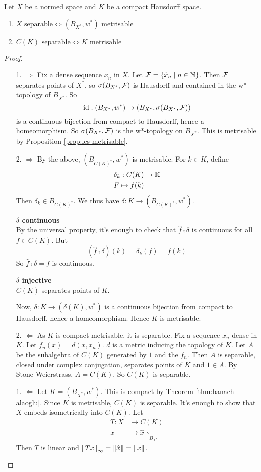 \documentclass{article}
\begin{document}
\begin{prop}\label{prop:ck-separable}
  Let $X$ be a normed space and $K$ be a compact Hausdorff space.
  \begin{enumerate}
    \item $X \text{ separable} \iff (B_{X^*}, w^*) \text{ metrisable}$
    \item $C(K) \text{ separable} \iff K \text{ metrisable}$
  \end{enumerate}
\end{prop}
\begin{proof}~
  \begin{itemize}
    \item[1. $\Rightarrow$] Fix a dense sequence $x_n$ in $X$. Let $\mathcal F = \{\hat x_n \mid n \in \mathbb N\}$. Then $\mathcal F$ separates points of $X^*$, so $\sigma(B_{X^*}, \mathcal F)$ is Hausdorff and contained in the w*-topology of $B_{X^*}$. So
    $$\operatorname{id} : (B_{X^*}, w^*) \to (B_{X^*}, \sigma(B_{X^*}, \mathcal F))$$
    is a continuous bijection from compact to Hausdorff, hence a homeomorphism. So $\sigma(B_{X^*}, \mathcal F)$ is the w*-topology on $B_{X^*}$. This is metrisable by Proposition \ref{prop:lcs-metrisable}.
  \item[2. $\Rightarrow$] By the above, $(B_{C(K)^*}, w^*)$ is metrisable. For $k \in K$, define
  \begin{align*}
    \delta_k : C(K) & \to \mathbb K \\
    F \mapsto f(k)
  \end{align*}
  Then $\delta_k \in B_{C(K)^*}$. We thus have $\delta : K \to (B_{C(K)^*}, w^*)$.

  {\bf $\delta$ continuous} \\
  By the universal property, it's enough to check that $\hat f \comp \delta$ is continuous for all $f \in C(K)$. But
  $$(\hat f \comp \delta)(k) = \delta_k(f) = f(k)$$
  So $\hat f \comp \delta = f$ is continuous.

  {\bf $\delta$ injective} \\
  $C(K)$ separates points of $K$.

  Now, $\delta : K \to (\delta(K), w^*)$ is a continuous bijection from compact to Hausdorff, hence a homeomorphism. Hence $K$ is metrisable.
  \item[2. $\Leftarrow$] As $K$ is compact metrisable, it is separable. Fix a sequence $x_n$ dense in $K$. Let $f_n(x) = d(x, x_n)$. $d$ is a metric inducing the topology of $K$. Let $A$ be the subalgebra of $C(K)$ generated by $1$ and the $f_n$. Then $A$ is separable, closed under complex conjugation, separates points of $K$ and $1 \in A$. By Stone-Weierstrass, $\bar A = C(K)$. So $C(K)$ is separable.
  \item[1. $\Leftarrow$] Let $K = (B_{X^*}, w^*)$. This is compact by Theorem \ref{thm:banach-alaoglu}. Since $K$ is metrisable, $C(K)$ is separable. It's enough to show that $X$ embeds isometrically into $C(K)$. Let
  \begin{align*}
    T : X & \to C(K) \\
    x & \mapsto \hat x\restriction_{B_{X^*}}
  \end{align*}
  Then $T$ is linear and $\left\lVert Tx\right\rVert_\infty = \left\lVert \hat x\right\rVert = \left\lVert x\right\rVert$.
  \end{itemize}
\end{proof}
\end{document}
